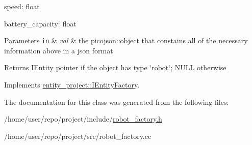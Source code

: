 speed\+: float

battery\+\_\+capacity\+: float 
\begin{DoxyParams}[1]{Parameters}
\mbox{\tt in}  & {\em val} & the picojson\+::object that constains all of the necessary information above in a json format \\
\hline
\end{DoxyParams}
\begin{DoxyReturn}{Returns}
I\+Entity pointer if the object has type \char`\"{}robot\char`\"{}; N\+U\+LL otherwise 
\end{DoxyReturn}


Implements \hyperlink{classentity__project_1_1IEntityFactory_ac4e8eaf4294958fef0b98bd3684704bb}{entity\+\_\+project\+::\+I\+Entity\+Factory}.



The documentation for this class was generated from the following files\+:\begin{DoxyCompactItemize}
\item 
/home/user/repo/project/include/\hyperlink{robot__factory_8h}{robot\+\_\+factory.\+h}\item 
/home/user/repo/project/src/robot\+\_\+factory.\+cc\end{DoxyCompactItemize}
